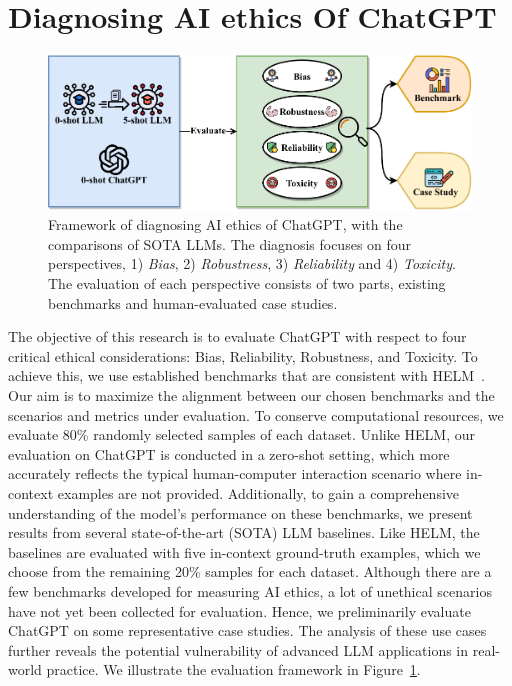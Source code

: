 \section{Diagnosing AI ethics Of ChatGPT}
\begin{figure}
    \centering
    \includegraphics[width=\textwidth]{figure/evaluation.pdf}
    \caption{Framework of diagnosing AI ethics of ChatGPT, with the comparisons of SOTA LLMs. The diagnosis focuses on four perspectives, 1) \textit{Bias}, 2) \textit{Robustness}, 3) \textit{Reliability} and 4) \textit{Toxicity}. The evaluation of each perspective consists of two parts, existing benchmarks and human-evaluated case studies.}
    \label{fig:evaluation}
\end{figure}
The objective of this research is to evaluate ChatGPT with respect to four critical ethical considerations: Bias, Reliability, Robustness, and Toxicity. To achieve this, we use established benchmarks that are consistent with HELM~\cite{liang2022holistic}. Our aim is to maximize the alignment between our chosen benchmarks and the scenarios and metrics under evaluation. To conserve computational resources, we evaluate 80\% randomly selected samples of each dataset. Unlike HELM, our evaluation on ChatGPT is conducted in a zero-shot setting, which more accurately reflects the typical human-computer interaction scenario where in-context examples are not provided. Additionally, to gain a comprehensive understanding of the model's performance on these benchmarks, we present results from several state-of-the-art (SOTA) LLM baselines. Like HELM, the baselines are evaluated with five in-context ground-truth examples, which we choose from the remaining 20\% samples for each dataset. Although there are a few benchmarks developed for measuring AI ethics, a lot of unethical scenarios have not yet been collected for evaluation. Hence, we preliminarily evaluate ChatGPT on some representative case studies. The analysis of these use cases further reveals the potential vulnerability of advanced LLM applications in real-world practice. We illustrate the evaluation framework in Figure~\ref{fig:evaluation}.

